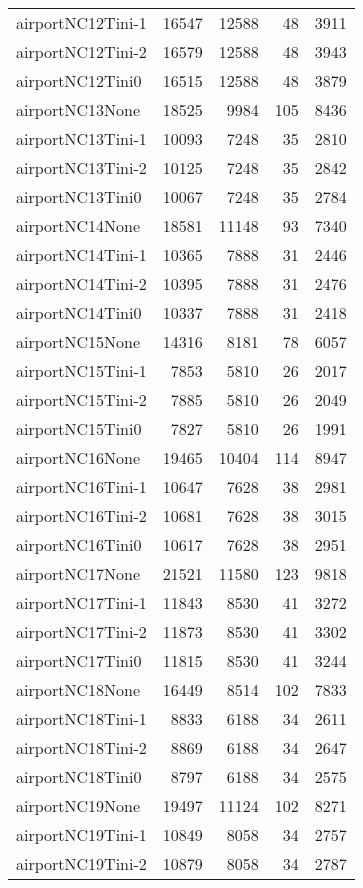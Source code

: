 \begin{longtable}{lrrrr}
airportNC12Tini-1 & 16547 & 12588 & 48 & 3911 \\
airportNC12Tini-2 & 16579 & 12588 & 48 & 3943 \\
airportNC12Tini0 & 16515 & 12588 & 48 & 3879 \\
airportNC13None & 18525 & 9984 & 105 & 8436 \\
airportNC13Tini-1 & 10093 & 7248 & 35 & 2810 \\
airportNC13Tini-2 & 10125 & 7248 & 35 & 2842 \\
airportNC13Tini0 & 10067 & 7248 & 35 & 2784 \\
airportNC14None & 18581 & 11148 & 93 & 7340 \\
airportNC14Tini-1 & 10365 & 7888 & 31 & 2446 \\
airportNC14Tini-2 & 10395 & 7888 & 31 & 2476 \\
airportNC14Tini0 & 10337 & 7888 & 31 & 2418 \\
airportNC15None & 14316 & 8181 & 78 & 6057 \\
airportNC15Tini-1 & 7853 & 5810 & 26 & 2017 \\
airportNC15Tini-2 & 7885 & 5810 & 26 & 2049 \\
airportNC15Tini0 & 7827 & 5810 & 26 & 1991 \\
airportNC16None & 19465 & 10404 & 114 & 8947 \\
airportNC16Tini-1 & 10647 & 7628 & 38 & 2981 \\
airportNC16Tini-2 & 10681 & 7628 & 38 & 3015 \\
airportNC16Tini0 & 10617 & 7628 & 38 & 2951 \\
airportNC17None & 21521 & 11580 & 123 & 9818 \\
airportNC17Tini-1 & 11843 & 8530 & 41 & 3272 \\
airportNC17Tini-2 & 11873 & 8530 & 41 & 3302 \\
airportNC17Tini0 & 11815 & 8530 & 41 & 3244 \\
airportNC18None & 16449 & 8514 & 102 & 7833 \\
airportNC18Tini-1 & 8833 & 6188 & 34 & 2611 \\
airportNC18Tini-2 & 8869 & 6188 & 34 & 2647 \\
airportNC18Tini0 & 8797 & 6188 & 34 & 2575 \\
airportNC19None & 19497 & 11124 & 102 & 8271 \\
airportNC19Tini-1 & 10849 & 8058 & 34 & 2757 \\
airportNC19Tini-2 & 10879 & 8058 & 34 & 2787 \\

\end{longtable}
